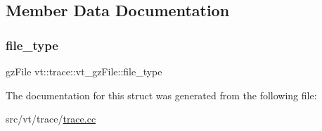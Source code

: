 \subsection{Member Data Documentation}
\mbox{\label{structvt_1_1trace_1_1vt__gz_file_ad76fc8569dffe67628ad492daee76dbf}} 
\subsubsection{\texorpdfstring{file\+\_\+type}{file\_type}}
{\footnotesize\ttfamily gz\+File vt\+::trace\+::vt\+\_\+gz\+File\+::file\+\_\+type}



The documentation for this struct was generated from the following file\+:\begin{DoxyCompactItemize}
\item 
src/vt/trace/\hyperlink{trace_8cc}{trace.\+cc}\end{DoxyCompactItemize}

